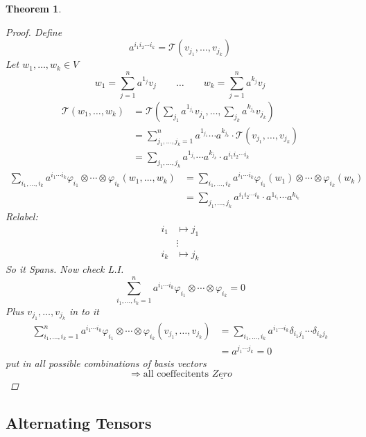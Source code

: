 \documentclass[11pt]{article}
\newtheorem{theorem}{Theorem}[section]
\begin{document}
\begin{theorem}
\begin{proof}
Define
\[a^{i_1i_2\cdots i_k} = \mathcal{T}(v_{j_1}, \dots , v_{j_k})\]
Let $w_1,\dots , w_k \in V$
\[w_1 = \sum\limits_{j=1}^{n}a^{1_j}v_j \qquad \dots \qquad w_k = \sum\limits_{j=1}^{n}a^{k_j}v_j\]
\begin{align*} \mathcal{T}(w_1 , \dots , w_k) &= \mathcal{T}\left( \sum\limits_{j_1}a^{1_{j_1}}v_{j_1} , \dots , \sum\limits_{j_k}a^{k_{j_k}}v_{j_k} \right)\\
&= \sum\limits_{j_1, \dots, j_k =1}^{n}a^{1_{j_1}}\cdots a^{k_{j_k}}\cdot\mathcal{T}(v_{j_1}, \dots , v_{j_k})\\
&=\sum\limits_{j_1, \dots, j_k}a^{1_{j_1}}\cdots a^{k_{j_k}}\cdot a^{i_1i_2\cdots i_k}
\end{align*}
\begin{align*}  \sum\limits_{i_1,\dots , i_k}a^{i_1\cdots i_k}\varphi_{i_1}\otimes\cdots\otimes\varphi_{i_k}(w_1, \dots , w_k) &=  \sum\limits_{i_1,\dots , i_k}a^{i_1\cdots i_k}\varphi_{i_1}(w_1)\otimes\cdots\otimes\varphi_{i_k}(w_k)\\
&=\sum\limits_{j_1, \dots, j_k}a^{i_1i_2\cdots i_k}\cdot a^{1_{i_1}}\cdots a^{k_{i_k}} \end{align*}
Relabel: \begin{align*} i_1 &\mapsto j_1 \\ &\vdots \\ i_k &\mapsto j_k \end{align*}
So it Spans. Now check L.I.
\[ \sum\limits_{i_1,\dots , i_k=1}^{n}a^{i_1\cdots i_k}\varphi_{i_1}\otimes\cdots\otimes\varphi_{i_k} =0\]
Plus $v_{j_1}, \dots , v_{j_k}$ in to it
\begin{align*} \sum\limits_{i_1,\dots , i_k=1}^{n}a^{i_1\cdots i_k}\varphi_{i_1}\otimes\cdots\otimes\varphi_{i_k}(v_{j_1}, \dots , v_{j_k})  &= \sum\limits_{i_1,\dots , i_k}a^{i_1\cdots i_k}\delta_{i_1 j_1}\cdots\delta_{i_k j_k}\\
&= a^{j_1\cdots j_k} = 0 \end{align*}
put in all possible combinations of basis vectors 
\[\Rightarrow \text{all coeffecitents }\underline{Zero}\]
\end{proof}
\end{theorem}

\subsection{Alternating Tensors}
\end{document}
